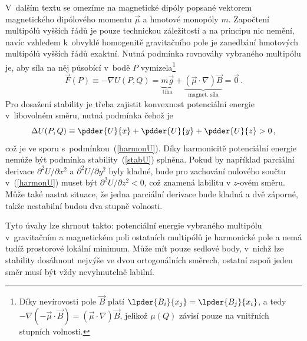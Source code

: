 V~dalším textu se omezíme na magnetické dipóly popsané vektorem magnetického
dipólového momentu $\vec{\mu}$ a hmotové monopóly $m$. Započtení multipólů
vyšších řádů je pouze technickou záležitostí a na principu nic nemění, navíc
vzhledem k~obvyklé homogenitě gravitačního pole je zanedbání hmotových
multipólů vyšších řádů exaktní.  Nutná podmínka rovnováhy vybraného multipólu
je, aby síla na něj působící v~bodě $P$ vymizela\footnote{Díky nevírovosti
  pole $\vec{B}$ platí $\lpder{B_{i}}{x_{j}}=\lpder{B_{j}}{x_{i}}$, a tedy
  $-\nabla(-\vec{\mu}\cdot\vec{B}) = (\vec{\mu}\cdot\nabla)\vec{B}$, jelikož
  $\mu(Q)$ závisí pouze na vnitřních stupních volnosti.}
\begin{equation}
  \vec{F}(P) \equiv -\nabla U(P,Q) =
  \underbrace{m\vec{g}}_{\text{tíha}}
  + \underbrace{(\vec{\mu}\cdot\nabla)\vec{B}}_{\text{magnet. síla}}
  = \vec{0}\,.                                                    \label{equlib}
\end{equation}
Pro dosažení stability je třeba zajistit konvexnost potenciální energie
v~libovolném směru, nutná podmínka čehož je
\begin{equation}
  \Delta U(P,Q)
  \equiv \pdder{U}{x} + \pdder{U}{y} + \pdder{U}{z} > 0\,,         \label{stabU}
\end{equation}
což je ve sporu s~podmínkou~(\ref{harmonU}). Díky harmonicitě potenciální
energie nemůže být podmínka stability~(\ref{stabU}) splněna. Pokud by
například parciální derivace $\partial^{2} U/\partial x^{2}$ a
$\partial^{2} U/\partial y^{2}$ byly kladné, bude pro zachování nulového
součtu v~(\ref{harmonU}) muset být $\partial^{2} U/\partial z^{2} < 0$, což
znamená labilitu v $z$-ovém směru. Může také nastat situace, že jedna
parciální derivace bude kladná a dvě záporné, takže nestabilní budou dva
stupně volnosti.

Tyto úvahy lze shrnout takto: potenciální energie vybraného multipólu
v~gravitačním a magnetickém poli ostatních multipólů je harmonické pole a nemá
tudíž prostorové lokální minimum. Může mít pouze sedlové body, v~nichž lze
stability dosáhnout nejvýše ve dvou ortogonálních směrech, ostatní aspoň jeden
směr musí být vždy nevyhnutelně labilní.

